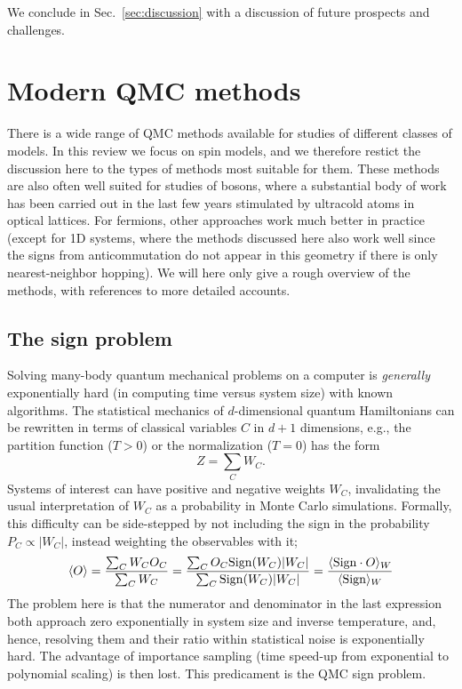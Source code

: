 \documentclass[range]{ar2e}
\begin{document}
We conclude in Sec.~\ref{sec:discussion} with a discussion of future prospects and challenges.

\section{Modern QMC methods}
\label{sec:methods}

There is a wide range of QMC methods available for studies of different classes of models. In this review we focus on spin models, and we 
therefore restict the discussion here to the types of methods most suitable for them. These methods are also often well suited for studies of 
bosons, where a substantial body of work has been carried out in the last few years stimulated by ultracold atoms in optical lattices. For 
fermions, other approaches work much better in practice (except for 1D systems, where the methods discussed here also work well since the signs 
from anticommutation do not appear in this geometry if there is only nearest-neighbor hopping). We will here only give a rough overview of the 
methods, with references to more detailed accounts.

\subsection{The sign problem}
\label{ss:sign}

Solving many-body quantum mechanical problems on a computer is {\em generally} exponentially 
hard (in computing time versus system size) with known algorithms. The statistical mechanics of 
$d$-dimensional quantum Hamiltonians can be rewritten in terms of classical variables $C$ in 
$d+1$ dimensions, e.g., the partition function ($T>0$) or the normalization ($T=0$) has the form
\begin{equation}
\label{eq:wc}
Z=\sum_C W_C.
\end{equation}
Systems of interest can have positive and negative weights $W_C$, invalidating the usual interpretation 
of $W_C$ as a probability in Monte Carlo simulations. Formally, this difficulty can be side-stepped by 
not including the sign in the probability $P_C \propto |W_C|$, instead weighting the observables with it;
\begin{equation}
\langle O \rangle = \frac{\sum_C W_C O_C}{\sum_C W_C} =
\frac{\sum_C O_C {\rm Sign}(W_C) |W_C|}{\sum_C {\rm Sign}(W_C)|W_C|} = 
\frac{\langle {\rm Sign} \cdot O\rangle_W}{\langle {\rm Sign}\rangle_W}
\label{expvalue}
\end{equation}
The problem here is that the numerator and denominator in the last expression both approach zero
exponentially in system size and inverse temperature, and, hence, resolving them and their ratio 
within statistical noise is exponentially hard. The advantage of importance sampling (time speed-up 
from exponential to polynomial scaling) is then lost. This predicament is the QMC sign problem.
\end{document}
